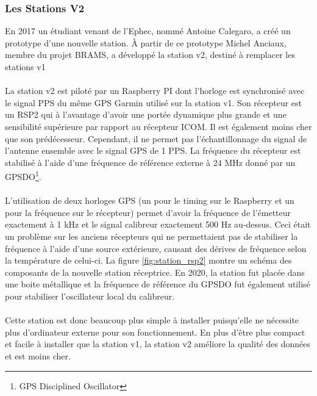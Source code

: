 \documentclass[11pt]{article}
\begin{document}
\subsubsection{Les Stations V2}

En 2017 un étudiant venant de l'Ephec, nommé Antoine Calegaro, a créé un prototype d'une nouvelle station.
À partir de ce prototype Michel Anciaux, membre du projet BRAMS, a développé la station v2, destiné à remplacer les stations v1\\
\\
La station v2 est piloté par un Raspberry PI dont l'horloge est synchronisé avec le signal PPS du même GPS Garmin utilisé sur la station v1.
Son récepteur est un RSP2 qui à l'avantage d'avoir une portée dynamique plus grande et une sensibilité supérieure par rapport au récepteur ICOM.
Il est également moins cher que son prédécesseur.
Cependant, il ne permet pas l'échantillonnage du signal de l'antenne ensemble avec le signal GPS de 1 PPS.
La fréquence du récepteur est stabilisé à l'aide d'une fréquence de référence externe à 24 MHz donné par un GPSDO\footnote{GPS Disciplined Oscillator}.\\
\\
L'utilisation de deux horloges GPS (un pour le timing sur le Raspberry et un pour la fréquence sur le récepteur) permet d'avoir la fréquence de l'émetteur exactement à 1 kHz et le signal calibreur exactement 500 Hz au-dessus.
Ceci était un problème sur les anciens récepteurs qui ne permettaient pas de stabiliser la fréquence à l'aide d'une source extérieure, causant des dérives de fréquence selon la température de celui-ci.
La figure \ref{fig:station_rsp2} montre un schéma des composants de la nouvelle station réceptrice.
En 2020, la station fut placée dans une boite métallique et la fréquence de référence du GPSDO fut également utilisé pour stabiliser l'oscillateur local du calibreur.\\
\\
Cette station est donc beaucoup plus simple à installer puisqu'elle ne nécessite plus d'ordinateur externe pour son fonctionnement.
En plus d'être plus compact et facile à installer que la station v1, la station v2 améliore la qualité des données et est moins cher.
\end{document}
